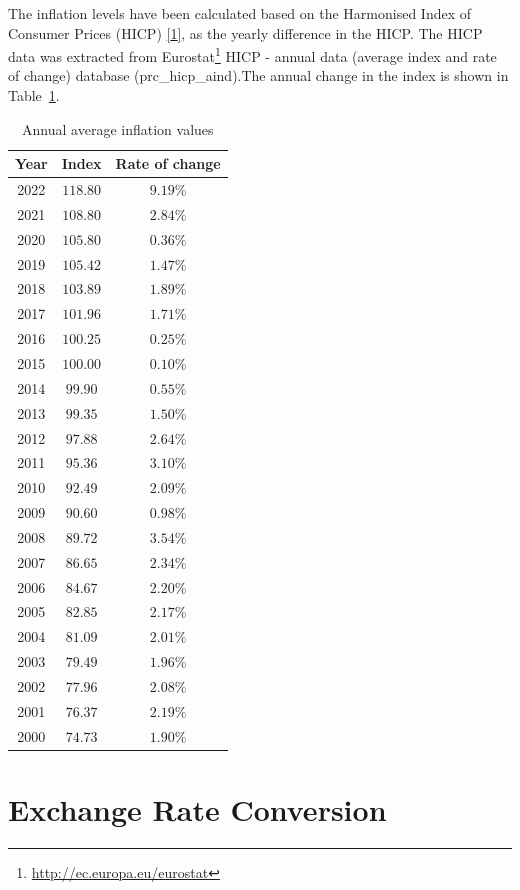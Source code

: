 \documentclass[
  11pt,
  a4paper,
]{book}
\DeclareRobustCommand{\href}[2]{#2\footnote{\url{#1}}}
\begin{document}

The inflation levels have been calculated based on the Harmonised Index
of Consumer Prices (HICP)
\protect\hyperlink{ref-eurostat:HICP}{{[}1{]}}, as the yearly difference
in the HICP. The HICP data was extracted from
\href{http://ec.europa.eu/eurostat}{Eurostat} HICP - annual data
(average index and rate of change) database (prc\_hicp\_aind).The annual
change in the index is shown in Table~\ref{tbl-inflation-table}.

\hypertarget{tbl-inflation-table}{}
\begin{longtable}{ccc}
\caption{\label{tbl-inflation-table}Annual average inflation values }\tabularnewline

\toprule
Year & Index & Rate of change \\ 
\midrule
2022 & $118.80$ & $9.19\%$ \\ 
2021 & $108.80$ & $2.84\%$ \\ 
2020 & $105.80$ & $0.36\%$ \\ 
2019 & $105.42$ & $1.47\%$ \\ 
2018 & $103.89$ & $1.89\%$ \\ 
2017 & $101.96$ & $1.71\%$ \\ 
2016 & $100.25$ & $0.25\%$ \\ 
2015 & $100.00$ & $0.10\%$ \\ 
2014 & $99.90$ & $0.55\%$ \\ 
2013 & $99.35$ & $1.50\%$ \\ 
2012 & $97.88$ & $2.64\%$ \\ 
2011 & $95.36$ & $3.10\%$ \\ 
2010 & $92.49$ & $2.09\%$ \\ 
2009 & $90.60$ & $0.98\%$ \\ 
2008 & $89.72$ & $3.54\%$ \\ 
2007 & $86.65$ & $2.34\%$ \\ 
2006 & $84.67$ & $2.20\%$ \\ 
2005 & $82.85$ & $2.17\%$ \\ 
2004 & $81.09$ & $2.01\%$ \\ 
2003 & $79.49$ & $1.96\%$ \\ 
2002 & $77.96$ & $2.08\%$ \\ 
2001 & $76.37$ & $2.19\%$ \\ 
2000 & $74.73$ & $1.90\%$ \\ 
\bottomrule
\end{longtable}

\hypertarget{exchange-rates}{%
\section*{Exchange Rate Conversion}\label{exchange-rates}}
\end{document}
